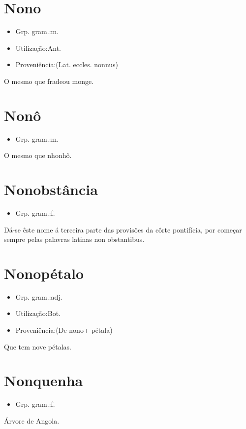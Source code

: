 \section{Nono}
\begin{itemize}
\item {Grp. gram.:m.}
\end{itemize}
\begin{itemize}
\item {Utilização:Ant.}
\end{itemize}
\begin{itemize}
\item {Proveniência:(Lat. eccles. \textunderscore nonnus\textunderscore )}
\end{itemize}
O mesmo que \textunderscore frade\textunderscore  ou \textunderscore monge\textunderscore .
\section{Nonô}
\begin{itemize}
\item {Grp. gram.:m.}
\end{itemize}
O mesmo que \textunderscore nhonhô\textunderscore .
\section{Nonobstância}
\begin{itemize}
\item {Grp. gram.:f.}
\end{itemize}
Dá-se êste nome á terceira parte das provisões da côrte pontifícia, por começar sempre pelas palavras latinas \textunderscore non obstantibus\textunderscore .
\section{Nonopétalo}
\begin{itemize}
\item {Grp. gram.:adj.}
\end{itemize}
\begin{itemize}
\item {Utilização:Bot.}
\end{itemize}
\begin{itemize}
\item {Proveniência:(De \textunderscore nono\textunderscore  + \textunderscore pétala\textunderscore )}
\end{itemize}
Que tem nove pétalas.
\section{Nonquenha}
\begin{itemize}
\item {Grp. gram.:f.}
\end{itemize}
Árvore de Angola.
